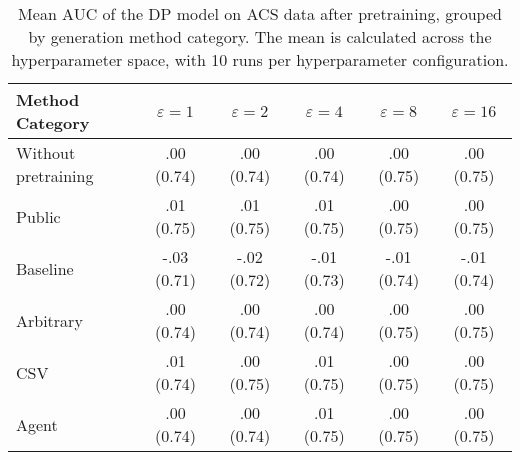 \begin{table}[h!]
    \centering
    \caption{Mean AUC of the DP model on ACS data after pretraining, grouped by generation method category. The mean is calculated across the hyperparameter space, with 10 runs per hyperparameter configuration.}
    \label{tab:epsilon_comparison}
    \begin{tabular}{lccccc}
    \toprule
    Method Category & $\varepsilon=1$ & $\varepsilon=2$ & $\varepsilon=4$ & $\varepsilon=8$ & $\varepsilon=16$ \\
    \midrule
    Without pretraining & .00 {\small (0.74)} & .00 {\small (0.74)} & .00 {\small (0.74)} & .00 {\small (0.75)} & .00 {\small (0.75)} \\
    \arrayrulecolor{black!50!}\midrule
    Public & \cellcolor{gold!30}.01 {\small (0.75)} & \cellcolor{gold!30}.01 {\small (0.75)} & \cellcolor{gold!30}.01 {\small (0.75)} & \cellcolor{silver!30}.00 {\small (0.75)} & \cellcolor{gold!30}.00 {\small (0.75)} \\
    \arrayrulecolor{black!50!}\midrule
    Baseline & -.03 {\small (0.71)} & -.02 {\small (0.72)} & -.01 {\small (0.73)} & -.01 {\small (0.74)} & -.01 {\small (0.74)} \\
    \arrayrulecolor{black!50!}\midrule
    Arbitrary & .00 {\small (0.74)} & .00 {\small (0.74)} & .00 {\small (0.74)} & .00 {\small (0.75)} & \cellcolor{bronze!30}.00 {\small (0.75)} \\
    \arrayrulecolor{black!50!}\midrule
    CSV & \cellcolor{silver!30}.01 {\small (0.74)} & \cellcolor{silver!30}.00 {\small (0.75)} & \cellcolor{silver!30}.01 {\small (0.75)} & \cellcolor{gold!30}.00 {\small (0.75)} & \cellcolor{gold!30}.00 {\small (0.75)} \\
    Agent & \cellcolor{bronze!30}.00 {\small (0.74)} & \cellcolor{bronze!30}.00 {\small (0.74)} & \cellcolor{bronze!30}.01 {\small (0.75)} & \cellcolor{bronze!30}.00 {\small (0.75)} & \cellcolor{silver!30}.00 {\small (0.75)} \\
    \bottomrule
    \end{tabular}
\end{table}